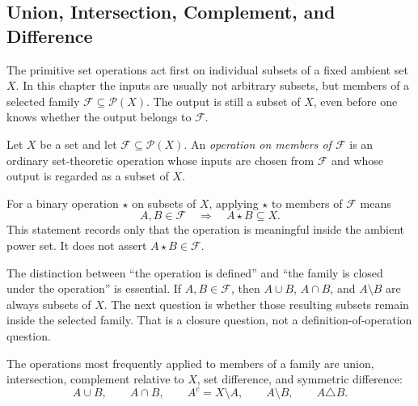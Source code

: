 \subsection{Union, Intersection, Complement, and Difference}

\begin{remark*}[Exposition]
The primitive set operations act first on individual subsets of a fixed
ambient set \(X\).  In this chapter the inputs are usually not arbitrary
subsets, but members of a selected family \(\mathcal{F}\subseteq\mathcal{P}(X)\).
The output is still a subset of \(X\), even before one knows whether the output
belongs to \(\mathcal{F}\).
\end{remark*}

\begin{definition}\label{def:operation-on-members-of-family}
Let \(X\) be a set and let \(\mathcal{F}\subseteq\mathcal{P}(X)\).  An
\emph{operation on members of \(\mathcal{F}\)} is an ordinary set-theoretic
operation whose inputs are chosen from \(\mathcal{F}\) and whose output is
regarded as a subset of \(X\).
\end{definition}

\begin{remark*}
For a binary operation \(\star\) on subsets of \(X\), applying \(\star\) to
members of \(\mathcal{F}\) means
\[
  A,B\in\mathcal{F}
  \quad\Longrightarrow\quad
  A\star B\subseteq X.
\]
This statement records only that the operation is meaningful inside the
ambient power set.  It does not assert \(A\star B\in\mathcal{F}\).
\end{remark*}

\begin{remark*}[Interpretation]
The distinction between ``the operation is defined'' and ``the family is
closed under the operation'' is essential.  If \(A,B\in\mathcal{F}\), then
\(A\cup B\), \(A\cap B\), and \(A\setminus B\) are always subsets of \(X\).
The next question is whether those resulting subsets remain inside the
selected family.  That is a closure question, not a definition-of-operation
question.
\end{remark*}

\begin{remark*}[Examples]
The operations most frequently applied to members of a family are union,
intersection, complement relative to \(X\), set difference, and symmetric
difference:
\[
  A\cup B,\qquad
  A\cap B,\qquad
  A^c=X\setminus A,\qquad
  A\setminus B,\qquad
  A\triangle B.
\]
\end{remark*}

